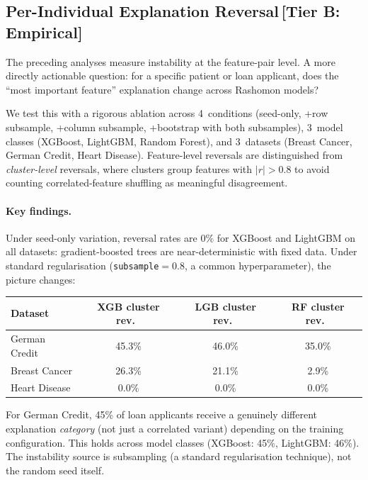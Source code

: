 \documentclass[11pt,a4paper]{article}
\begin{document}
\subsection{Per-Individual Explanation Reversal\,\textnormal{\normalsize[Tier B: Empirical]}}
\label{sec:individual-reversal}

The preceding analyses measure instability at the feature-pair level. A more directly actionable question: for a specific patient or loan applicant, does the ``most important feature'' explanation change across Rashomon models?

We test this with a rigorous ablation across 4~conditions (seed-only, +row subsample, +column subsample, +bootstrap with both subsamples), 3~model classes (XGBoost, LightGBM, Random Forest), and 3~datasets (Breast Cancer, German Credit, Heart Disease). Feature-level reversals are distinguished from \emph{cluster-level} reversals, where clusters group features with $|r| > 0.8$ to avoid counting correlated-feature shuffling as meaningful disagreement.

\paragraph{Key findings.}
Under seed-only variation, reversal rates are 0\% for XGBoost and LightGBM on all datasets: gradient-boosted trees are near-deterministic with fixed data. Under standard regularisation (\texttt{subsample}${}= 0.8$, a common hyperparameter), the picture changes:

\begin{center}
\small
\begin{tabular}{lccc}
\toprule
Dataset & XGB cluster rev.\ & LGB cluster rev.\ & RF cluster rev.\ \\
\midrule
German Credit   & 45.3\% & 46.0\% & 35.0\% \\
Breast Cancer   & 26.3\% & 21.1\% & 2.9\% \\
Heart Disease   & 0.0\%  & 0.0\%  & 0.0\% \\
\bottomrule
\end{tabular}
\end{center}

For German Credit, 45\% of loan applicants receive a genuinely different explanation \emph{category} (not just a correlated variant) depending on the training configuration. This holds across model classes (XGBoost: 45\%, LightGBM: 46\%). The instability source is subsampling (a standard regularisation technique), not the random seed itself.
\end{document}
